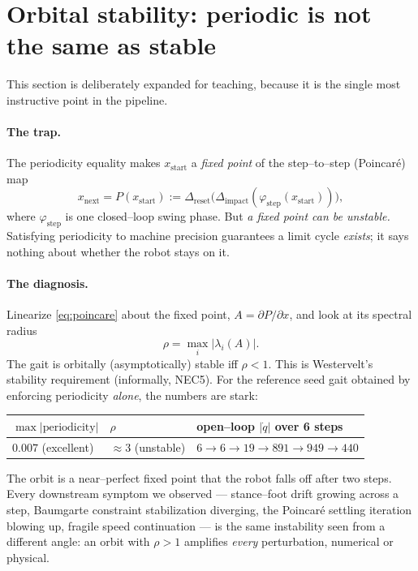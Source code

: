 \documentclass[11pt,a4paper]{article}
\begin{document}
\section{Orbital stability: periodic is not the same as stable}
\label{sec:stability}
This section is deliberately expanded for teaching, because it is the single
most instructive point in the pipeline.

\paragraph{The trap.} The periodicity equality makes $x_{\text{start}}$ a
\emph{fixed point} of the step--to--step (Poincar\'e) map
\begin{equation}
  x_{\text{next}} = P(x_{\text{start}})
      := \Delta_{\text{reset}}\big(\Delta_{\text{impact}}(\varphi_{\text{step}}(x_{\text{start}}))\big),
  \label{eq:poincare}
\end{equation}
where $\varphi_{\text{step}}$ is one closed--loop swing phase. But \emph{a fixed
point can be unstable.} Satisfying periodicity to machine precision guarantees a
limit cycle \emph{exists}; it says nothing about whether the robot stays on it.

\paragraph{The diagnosis.} Linearize \eqref{eq:poincare} about the fixed point,
$A = \partial P/\partial x$, and look at its spectral radius
\begin{equation}
  \rho = \max_i |\lambda_i(A)|.
\end{equation}
The gait is orbitally (asymptotically) stable iff $\rho < 1$. This is
Westervelt's stability requirement (informally, NEC5). For the reference seed
gait obtained by enforcing periodicity \emph{alone}, the numbers are stark:
\begin{center}
\begin{tabular}{@{}lll@{}}
\toprule
$\max|\text{periodicity}|$ & $\rho$ & open--loop $|\dot q|$ over 6 steps \\
\midrule
$0.007$ (excellent) & $\approx 3$ (unstable) &
  $6 \to 6 \to 19 \to 891 \to 949 \to 440$ \\
\bottomrule
\end{tabular}
\end{center}
The orbit is a near--perfect fixed point that the robot falls off after two
steps. Every downstream symptom we observed --- stance--foot drift growing
across a step, Baumgarte constraint stabilization diverging, the Poincar\'e
settling iteration blowing up, fragile speed continuation --- is the same
instability seen from a different angle: an orbit with $\rho>1$ amplifies
\emph{every} perturbation, numerical or physical.
\end{document}

